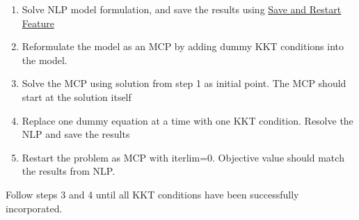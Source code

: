 \documentclass{article}
\begin{document}
\begin{comment}

\begin{equation}
\begin{aligned}
& \bigtriangledown{f(\hat{x})} - \sum_{i=1}^{m} u_{i} \bigtriangledown{g_{i}(\hat{x})}
			- \sum_{k=1}^{p} v_{i} \bigtriangledown{h_{k}(\hat{x})} - \sum_{l=1}^{q} w_{i} \bigtriangledown{d_{l}(\hat{x})} = 0  \\
\\
& h_{k}(\hat{x}) = 0   k = 1,2...p  \\
g_{i}(\hat{x}) \leq 0&	 i = 1,2...m \\  d_{l}(\hat{x}) \geq =0	&	l = 1,2...q
\\
and,\\
<u_{i},g_{i}(x)> = 0 \\ <v_{i},h_{k}(x)> =0 \\  <w_{l},d_{l}(x)> =0
\end{aligned}
\end{equation}

where $<u_{i},g_{i}(x)> = 0$  represent the complimentarily condition and variables u, v, and w represent the marginals of the respective constraint. It is often written as

 $g_{i}(x) \perp L \leq u \leq U $

where symbol $\perp $(referred to as perpendicular  to) indicates pair-wise complementarity between the function g() and variable u and its bounds. The complimentarity condition essentially

\end{comment}


\begin{enumerate}
	\item Solve NLP model formulation, and save the results using \href{https://www.gams.com/latest/docs/UG_SaveRestart.html}{Save and Restart Feature}
	\item	Reformulate the model as an MCP by adding dummy KKT conditions into the model.
  \item Solve the MCP using solution from step 1 as initial point. The MCP should start at the solution itself
	\item Replace one dummy equation at a time with one KKT condition. Resolve the NLP and save the results
	\item Restart the problem as MCP with iterlim=0. Objective value should match the results from NLP.
\end{enumerate}
\noindent Follow steps 3 and 4 until all KKT conditions have been successfully incorporated.
\end{document}
